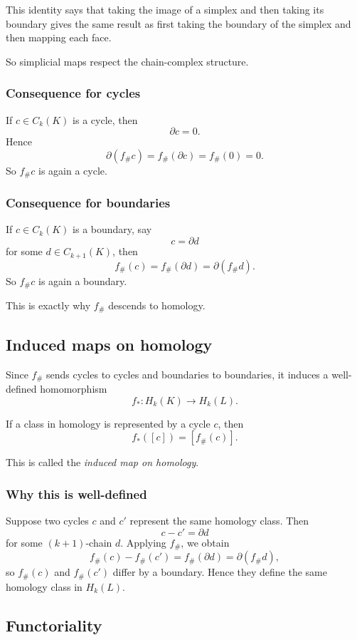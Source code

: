 \documentclass[12pt,a4paper]{article}
\theoremstyle{notespace}
\begin{document}
This identity says that taking the image of a simplex and then taking its boundary gives the same result as first taking the boundary of the simplex and then mapping each face.

So simplicial maps respect the chain-complex structure.

\subsubsection{Consequence for cycles}

If \(c\in C_k(K)\) is a cycle, then
\[
\partial c=0.
\]
Hence
\[
\partial(f_\#c)=f_\#(\partial c)=f_\#(0)=0.
\]
So \(f_\#c\) is again a cycle.

\subsubsection{Consequence for boundaries}

If \(c\in C_k(K)\) is a boundary, say
\[
c=\partial d
\]
for some \(d\in C_{k+1}(K)\), then
\[
f_\#(c)=f_\#(\partial d)=\partial(f_\#d).
\]
So \(f_\#c\) is again a boundary.

This is exactly why \(f_\#\) descends to homology.

\subsection{Induced maps on homology}

Since \(f_\#\) sends cycles to cycles and boundaries to boundaries, it induces a well-defined homomorphism
\[
f_*:H_k(K)\to H_k(L).
\]

If a class in homology is represented by a cycle \(c\), then
\[
f_*([c])=[f_\#(c)].
\]

This is called the \emph{induced map on homology}.

\subsubsection{Why this is well-defined}

Suppose two cycles \(c\) and \(c'\) represent the same homology class. Then
\[
c-c'=\partial d
\]
for some \((k+1)\)-chain \(d\). Applying \(f_\#\), we obtain
\[
f_\#(c)-f_\#(c')=f_\#(\partial d)=\partial(f_\#d),
\]
so \(f_\#(c)\) and \(f_\#(c')\) differ by a boundary. Hence they define the same homology class in \(H_k(L)\).

\subsection{Functoriality}
\end{document}
